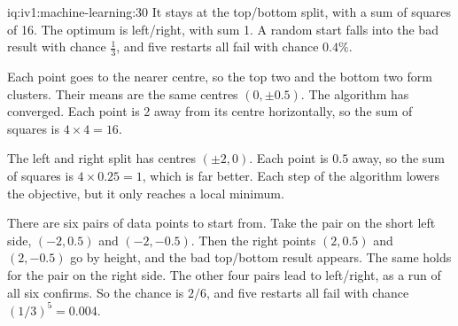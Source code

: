 \begin{solution}{iq:iv1:machine-learning:30}
It stays at the top/bottom split, with a sum of squares of 16. The optimum is left/right, with sum 1. A random start falls into the bad result with chance $\frac13$, and five restarts all fail with chance $0.4\%$.

Each point goes to the nearer centre, so the top two and the bottom two form clusters. Their means are the same centres $(0, \pm 0.5)$. The algorithm has converged. Each point is 2 away from its centre horizontally, so the sum of squares is $4 \times 4 = 16$.

The left and right split has centres $(\pm 2, 0)$. Each point is $0.5$ away, so the sum of squares is $4 \times 0.25 = 1$, which is far better. Each step of the algorithm lowers the objective, but it only reaches a local minimum.

There are six pairs of data points to start from. Take the pair on the short left side, $(-2, 0.5)$ and $(-2, -0.5)$. Then the right points $(2, 0.5)$ and $(2, -0.5)$ go by height, and the bad top/bottom result appears. The same holds for the pair on the right side. The other four pairs lead to left/right, as a run of all six confirms. So the chance is $2/6$, and five restarts all fail with chance $(1/3)^5 = 0.004$.



\end{solution}

